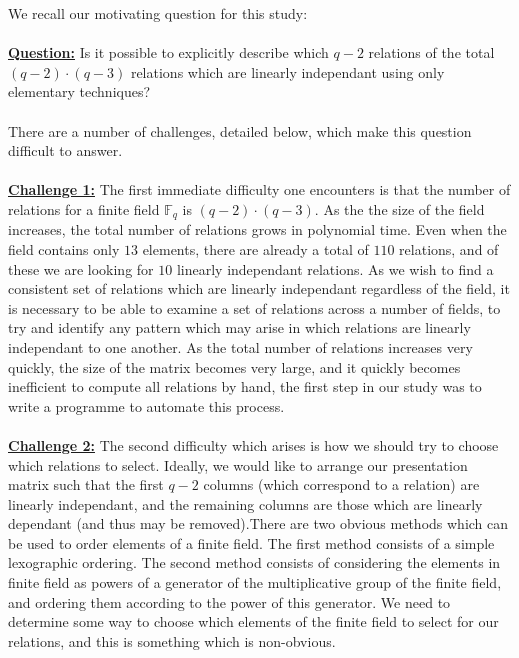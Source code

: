 \documentclass[11pt]{article}
\theoremstyle{plain}
\theoremstyle{definition}
\begin{document}
We recall our motivating question for this study:\\
\\
\textbf{\underline{Question:}} Is it possible to explicitly describe which $q-2$ relations of the total $(q-2)\cdot (q-3)$ relations which are linearly independant using only elementary techniques? \\
\\
There are a number of challenges, detailed below, which make this question difficult to answer.\\
\\
 \textbf{\underline{Challenge 1:}} The first immediate difficulty one encounters is that the number of relations for a finite field $\mathbb{F}_q$ is $(q-2)\cdot (q-3)$. As the the size of the field increases, the total number of relations grows in polynomial time. Even when the field contains only $13$ elements, there are already a total of $110$ relations, and of these we are looking for $10$ linearly independant relations. As we wish to find a consistent set of relations which are linearly independant regardless of the field, it is necessary to be able to examine a set of relations across a number of fields, to try and identify any pattern which may arise in which relations are linearly independant to one another. As the total number of relations increases very quickly, the size of the matrix becomes very large, and it quickly becomes inefficient to compute all relations by hand, the first step in our study was to write a programme to automate this process.\\
 \\
 \textbf{\underline{Challenge 2:}} The second difficulty which arises is how we should try to  choose which relations to select. Ideally, we would like to arrange our presentation matrix such that the first $q-2$ columns (which correspond to a relation) are linearly independant, and the remaining columns are those which are linearly dependant (and thus may be removed).There are two obvious methods which can be used to order elements of a finite field. The first method consists of a simple lexographic ordering. The second method consists of considering the elements in finite field as powers of a generator of the multiplicative group of the finite field, and ordering them according to the power of this generator. We need to determine some way to choose which elements of the finite field to select for our relations, and this is something which is non-obvious. \\
\\
\end{document}
